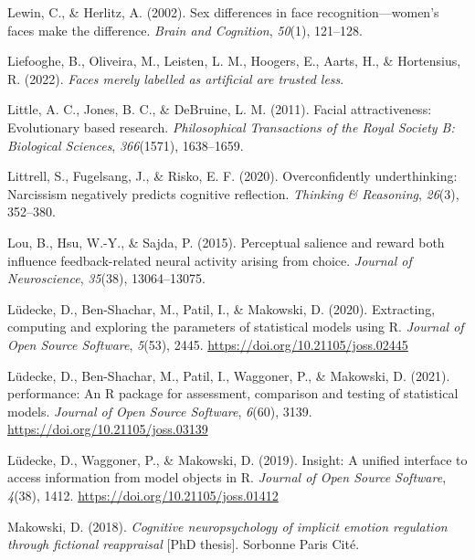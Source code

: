 \documentclass[
  man,floatsintext]{apa6}
\newlength{\cslhangindent}
\newlength{\cslentryspacingunit} %
\newenvironment{CSLReferences}[2] %
 {%
  \setlength{\parindent}{0pt}
  \ifodd #1
  \let\oldpar\par
  \def\par{\hangindent=\cslhangindent\oldpar}
  \fi
  \setlength{\parskip}{#2\cslentryspacingunit}
 }%
 {}
\begin{document}
\begin{CSLReferences}{1}{0}
\leavevmode{}%
Lewin, C., \& Herlitz, A. (2002). Sex differences in face recognition---women's faces make the difference. \emph{Brain and Cognition}, \emph{50}(1), 121--128.

\leavevmode{}%
Liefooghe, B., Oliveira, M., Leisten, L. M., Hoogers, E., Aarts, H., \& Hortensius, R. (2022). \emph{Faces merely labelled as artificial are trusted less}.

\leavevmode{}%
Little, A. C., Jones, B. C., \& DeBruine, L. M. (2011). Facial attractiveness: Evolutionary based research. \emph{Philosophical Transactions of the Royal Society B: Biological Sciences}, \emph{366}(1571), 1638--1659.

\leavevmode{}%
Littrell, S., Fugelsang, J., \& Risko, E. F. (2020). Overconfidently underthinking: Narcissism negatively predicts cognitive reflection. \emph{Thinking \& Reasoning}, \emph{26}(3), 352--380.

\leavevmode{}%
Lou, B., Hsu, W.-Y., \& Sajda, P. (2015). Perceptual salience and reward both influence feedback-related neural activity arising from choice. \emph{Journal of Neuroscience}, \emph{35}(38), 13064--13075.

\leavevmode{}%
Lüdecke, D., Ben-Shachar, M., Patil, I., \& Makowski, D. (2020). Extracting, computing and exploring the parameters of statistical models using {R}. \emph{Journal of Open Source Software}, \emph{5}(53), 2445. \url{https://doi.org/10.21105/joss.02445}

\leavevmode{}%
Lüdecke, D., Ben-Shachar, M., Patil, I., Waggoner, P., \& Makowski, D. (2021). {performance}: An {R} package for assessment, comparison and testing of statistical models. \emph{Journal of Open Source Software}, \emph{6}(60), 3139. \url{https://doi.org/10.21105/joss.03139}

\leavevmode{}%
Lüdecke, D., Waggoner, P., \& Makowski, D. (2019). Insight: A unified interface to access information from model objects in {R}. \emph{Journal of Open Source Software}, \emph{4}(38), 1412. \url{https://doi.org/10.21105/joss.01412}

\leavevmode{}%
Makowski, D. (2018). \emph{Cognitive neuropsychology of implicit emotion regulation through fictional reappraisal} {[}PhD thesis{]}. Sorbonne Paris Cit{é}.


\end{CSLReferences}
\end{document}
